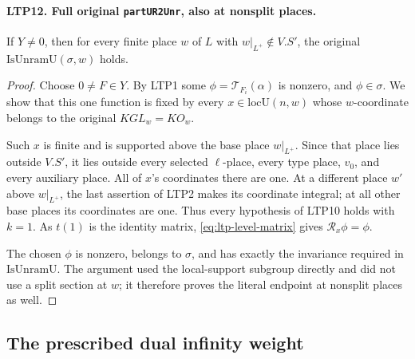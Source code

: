\paragraph{LTP12. Full original \texttt{partUR2Unr}, also at nonsplit places.}
\label{claim:LTP12}
If \(Y\ne0\), then for every finite place \(w\) of \(L\) with
\(w|_{L^+}\notin V.S'\), the original
\(\mathrm{IsUnramU}(\sigma,w)\) holds.
\begin{proof}
Choose \(0\ne F\in Y\).  By LTP1 some
\(\phi=\mathcal T_{F_i}(\alpha)\) is nonzero, and \(\phi\in\sigma\).
We show that this one function is fixed by every
\(x\in\mathrm{locU}(n,w)\) whose \(w\)-coordinate belongs to
the original \(KGL_w=KO_w\).

Such \(x\) is finite and is supported above the base place
\(w|_{L^+}\).  Since that place lies outside \(V.S'\), it lies
outside every selected \(\ell\)-place, every type place, \(v_0\),
and every auxiliary place.  All of \(x\)'s coordinates there
are one.  At a different place \(w'\) above \(w|_{L^+}\), the
last assertion of LTP2 makes its coordinate integral; at all
other base places its coordinates are one.  Thus every hypothesis
of LTP10 holds with \(k=1\).
As \(t(1)\) is the identity matrix,
\eqref{eq:ltp-level-matrix} gives \(\mathscr R_x\phi=\phi\).

The chosen \(\phi\) is nonzero, belongs to \(\sigma\), and has
exactly the invariance required in \(\mathrm{IsUnramU}\).
The argument used the local-support subgroup directly and did
not use a split section at \(w\); it therefore proves the
literal endpoint at nonsplit places as well.
\end{proof}

\subsection{The prescribed dual infinity weight}

